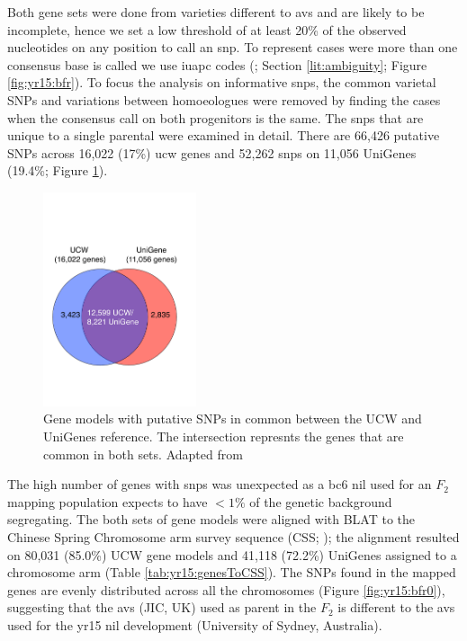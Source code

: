 Both gene sets were done from varieties different to \acrshort{avs} and are likely to be incomplete, hence we set a low threshold of at least 20\% of the observed nucleotides on any position to call an \acrshort{snp}. 
To represent cases were more than one consensus base is called we use \gls{iuapc} codes (\citet{Cornish-Bowden1985}; Section \ref{lit:ambiguity}; Figure \ref{fig:yr15:bfr}).  
To focus the analysis on informative \acrshort{snp}s, the common varietal SNPs and variations between homoeologues were removed by finding the cases when the consensus call on both progenitors is the same. 
The \acrshort{snp}s that are unique to a single parental were examined in detail. 
There are 66,426 putative SNPs across 16,022 (17\%) \acrshort{ucw} genes and 52,262 \acrshort{snp}s on 11,056 UniGenes (19.4\%; Figure \ref{fig:yr15:geneCount}).  

\begin{figure}
    \includegraphics[width=0.4\textwidth]{Yr15/Figures/geneCounts.pdf} 
    \caption{Gene models with putative SNPs in common between the UCW and UniGenes reference. The intersection represnts the genes that are common in both sets. Adapted from \citet{Ramirez-Gonzalez2015b}}
    \label{fig:yr15:geneCount}
\end{figure}



The high number of genes with \acrshort{snp}s was unexpected as a \acrshort{bc}6 \acrshort{nil} used for an $F_2$ mapping population expects to have $<1\%$ of the genetic background segregating. 
The both sets of gene models were aligned with BLAT \citep{Kent2002} to the Chinese Spring Chromosome arm survey sequence (CSS; \citealt{Mayer2014}); the alignment resulted on 80,031 (85.0\%) UCW gene models and 41,118 (72.2\%) UniGenes assigned to a chromosome arm (Table \ref{tab:yr15:genesToCSS}). 
The SNPs found in the mapped genes are evenly distributed across all the chromosomes (Figure \ref{fig:yr15:bfr0}), suggesting that the \acrlong{avs} (JIC, UK) used as parent in the $F_{2}$ is different to the \acrlong{avs} used for the \acrshort{yr15} \acrshort{nil} development (University of Sydney, Australia).  



